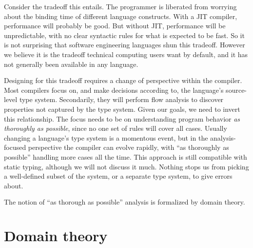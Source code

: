Consider the tradeoff this entails.
The programmer is liberated from worrying about the binding time of
different language constructs.
With a JIT compiler, performance will probably be good.
But without JIT, performance will be unpredictable, with no clear
syntactic rules for what is expected to be fast.
So it is not surprising that software engineering languages shun this
tradeoff.
However we believe it is the tradeoff technical computing
users want by default, and it has not generally been available
in any language.

Designing for this tradeoff requires a change of perspective
within the compiler.
Most compilers focus on, and make decisions according to, the
language's source-level type system.
Secondarily, they will perform flow analysis to discover
properties not captured by the type system.
Given our goals, we need to invert this relationship.
The focus needs to be on understanding program behavior
\emph{as thoroughly as possible}, since no one set of rules
will cover all cases.
Usually changing a language's type system is a momentous event,
but in the analysis-focused perspective the compiler can evolve
rapidly, with ``as thoroughly as possible'' handling more cases
all the time.
This approach is still compatible with static typing, although we will not
discuss it much.
Nothing stops us from picking a well-defined subset of the system,
or a separate type system, to give errors about.

The notion of ``as thorough as possible'' analysis is formalized
by domain theory.




\section{Domain theory}

